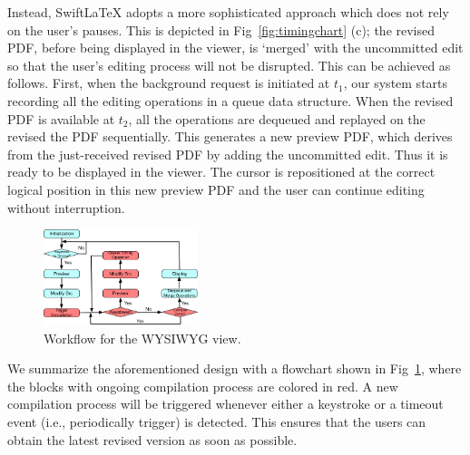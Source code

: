 \documentclass[sigconf]{acmart}
\begin{document}
Instead, SwiftLaTeX adopts a more sophisticated approach which does not rely on the user's pauses.
This is depicted in Fig~\ref{fig:timingchart} (c); the revised PDF, before being displayed in the viewer, is `merged' with the uncommitted edit so that the user's editing process will not be disrupted.
This can be achieved as follows.  
First, when the background request is initiated at $t_1$, our system starts recording all the editing operations in a queue data structure.
When the revised PDF is available at $t_2$, all the operations are dequeued  and replayed on the revised the PDF sequentially.
This generates a new preview PDF, which derives from the just-received revised PDF by adding the uncommitted edit.
Thus it is ready to be displayed in the viewer. The cursor is repositioned at the correct logical position in this new preview PDF and the user can continue editing without interruption.

\begin{figure}[t]
\begin{center}
\includegraphics[width=0.40\textwidth]{figure/flowchart}
\caption{Workflow for the WYSIWYG view.}
\label{fig:flowchart}
\end{center}
\end{figure}


We summarize the aforementioned design with a flowchart shown in Fig~\ref{fig:flowchart}, where the blocks with ongoing compilation process are colored in red. A new compilation process will be triggered whenever either a keystroke or a timeout event (i.e., periodically trigger) is detected. This ensures that the users can obtain the latest revised version as soon as possible.



\end{document}
